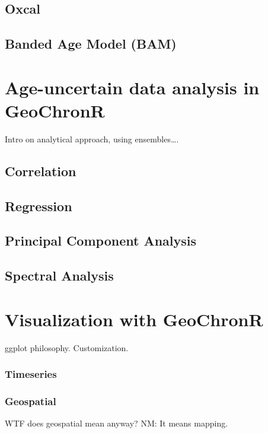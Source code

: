 \documentclass[gc, manuscript]{copernicus}
\begin{document}
\subsection{Oxcal}

\subsection{Banded Age Model (BAM)}

\hypertarget{age-uncertain-analysis}{%
\section{Age-uncertain data analysis in
GeoChronR}\label{age-uncertain-analysis}}

Intro on analytical approach, using ensembles\ldots{}.

\subsection{Correlation}

\subsection{Regression}

\subsection{Principal Component Analysis}

\subsection{Spectral Analysis}

\section{Visualization with GeoChronR}

ggplot philosophy. Customization.

\subsubsection{Timeseries}

\subsubsection{Geospatial}

WTF does geospatial mean anyway? NM: It means mapping.
\end{document}
